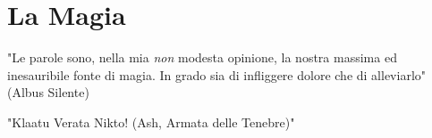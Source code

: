 \documentclass[a4paper,twoside,openany]{book}
\begin{document}
\setcounter{page}{1}



\section{La Magia}


\label{la-magia}
\begin{tcolorbox}[enhanced,arc=5pt,boxrule=0.3pt]{
"Le parole sono, nella mia \emph{non} modesta opinione, la nostra massima ed inesauribile fonte di magia. In grado sia di infliggere dolore che di alleviarlo" (Albus Silente)

\medskip

"Klaatu Verata Nikto! (Ash, Armata delle Tenebre)"

} \end{tcolorbox}
\end{document}
